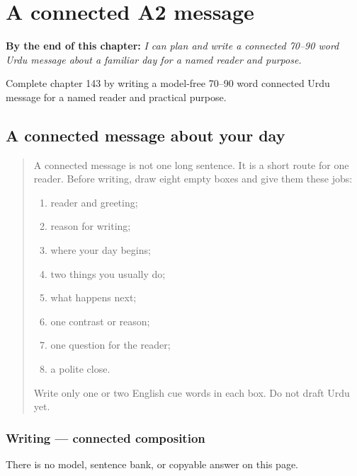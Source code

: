 
\chapter{A connected A2 message}
\label{ch:ur-a-connected-a2-message}

\begin{chapteropening}
\textbf{By the end of this chapter:} \emph{I can plan and write a connected 70–90 word Urdu message about a familiar day for a named reader and purpose.}

Complete chapter 143 by writing a model-free 70–90 word connected Urdu message for a named reader and practical purpose.
\end{chapteropening}

\section[(connected A2 writing)]{A connected message about your day}

\label{lesson:UR-W11-a2-connected-composition}



\begin{quote}
A connected message is not one long sentence. It is a short route for one reader. Before writing, draw eight empty boxes and give them these jobs:

\begin{enumerate}
\raggedright
  \item reader and greeting;
  \item reason for writing;
  \item where your day begins;
  \item two things you usually do;
  \item what happens next;
  \item one contrast or reason;
  \item one question for the reader;
  \item a polite close.
\end{enumerate}

Write only one or two English cue words in each box. Do not draft Urdu yet.
\end{quote}

\subsection*{Writing — connected composition}
There is no model, sentence bank, or copyable answer on this page.

